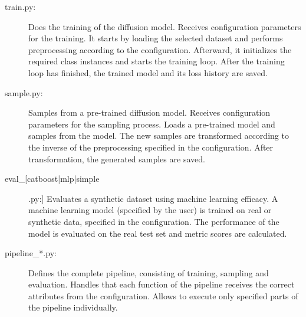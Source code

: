 \begin{description}
	\item[train.py:]
		Does the training of the diffusion model.
		Receives configuration parameters for the training.
		It starts by loading the selected dataset and performs preprocessing according to the configuration.
		Afterward, it initializes the required class instances and starts the training loop.
		After the training loop has finished, the trained model and its loss history are saved.

	\item[sample.py:]
		Samples from a pre-trained diffusion model.
		Receives configuration parameters for the sampling process.
		Loads a pre-trained model and samples from the model.
		The new samples are transformed according to the inverse of the preprocessing specified in the configuration.
		After transformation, the generated samples are saved.

		\item[eval\_[catboost|mlp|simple].py:]
		Evaluates a synthetic dataset using machine learning efficacy.
		A machine learning model (specified by the user) is trained on real or synthetic data, specified in the configuration.
		The performance of the model is evaluated on the real test set and metric scores are calculated.

	\item[pipeline\_*.py\footnotemark:]
		Defines the complete pipeline, consisting of training, sampling and evaluation.
		Handles that each function of the pipeline receives the correct attributes from the configuration.
		Allows to execute only specified parts of the pipeline individually.


\end{description}
